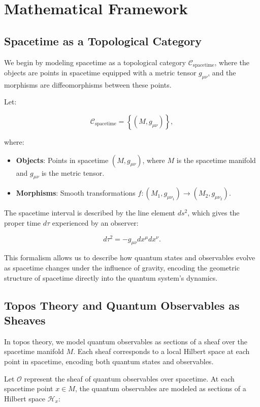 \documentclass{article}
\begin{document}
\section{Mathematical Framework}

\subsection{Spacetime as a Topological Category}

We begin by modeling spacetime as a topological category \( \mathcal{C}_{\text{spacetime}} \), where the objects are points in spacetime equipped with a metric tensor \( g_{\mu\nu} \), and the morphisms are diffeomorphisms between these points.

Let:

\[
\mathcal{C}_{\text{spacetime}} = \left\{ (M, g_{\mu\nu}) \right\},
\]

where:

\begin{itemize}
    \item \textbf{Objects}: Points in spacetime \( (M, g_{\mu\nu}) \), where \( M \) is the spacetime manifold and \( g_{\mu\nu} \) is the metric tensor.
    \item \textbf{Morphisms}: Smooth transformations \( f: (M_1, g_{\mu\nu_1}) \to (M_2, g_{\mu\nu_2}) \).
\end{itemize}

The spacetime interval is described by the line element \( ds^2 \), which gives the proper time \( d\tau \) experienced by an observer:

\[
d\tau^2 = -g_{\mu\nu} dx^\mu dx^\nu.
\]

This formalism allows us to describe how quantum states and observables evolve as spacetime changes under the influence of gravity, encoding the geometric structure of spacetime directly into the quantum system's dynamics.

\subsection{Topos Theory and Quantum Observables as Sheaves}

In topos theory, we model quantum observables as sections of a sheaf over the spacetime manifold \( M \). Each sheaf corresponds to a local Hilbert space at each point in spacetime, encoding both quantum states and observables.

Let \( \mathcal{O} \) represent the sheaf of quantum observables over spacetime. At each spacetime point \( x \in M \), the quantum observables are modeled as sections of a Hilbert space \( \mathcal{H}_x \):
\end{document}
